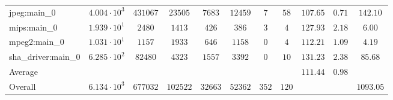 \begin{tabular}{|l|c|c|c|c|c|c|c|c|c|c|}
jpeg:main\_0            & $ 4.004 \cdot 10^{3}  $ & $ 431067 $ & $ 23505  $ & $ 7683  $ & $ 12459 $ & $ 7   $ & $ 58  $ & $ 107.65      $ & $ 0.71    $ & $ 142.10  $ \\
mips:main\_0            & $ 1.939 \cdot 10^{1}  $ & $ 2480   $ & $ 1413   $ & $ 426   $ & $ 386   $ & $ 3   $ & $ 4   $ & $ 127.93      $ & $ 2.18    $ & $ 6.00    $ \\
mpeg2:main\_0           & $ 1.031 \cdot 10^{1}  $ & $ 1157   $ & $ 1933   $ & $ 646   $ & $ 1158  $ & $ 0   $ & $ 4   $ & $ 112.21      $ & $ 1.09    $ & $ 4.19    $ \\
sha\_driver:main\_0     & $ 6.285 \cdot 10^{2}  $ & $ 82480  $ & $ 4323   $ & $ 1557  $ & $ 3392  $ & $ 0   $ & $ 10  $ & $ 131.23      $ & $ 2.38    $ & $ 85.68   $ \\
\hline
Average                 & $                     $ & $        $ & $        $ & $       $ & $       $ & $     $ & $     $ & $ 111.44      $ & $ 0.98    $ & $         $ \\
\hline
Overall                 & $ 6.134 \cdot 10^{3}  $ & $ 677032 $ & $ 102522 $ & $ 32663 $ & $ 52362 $ & $ 352 $ & $ 120 $ & $             $ & $         $ & $ 1093.05 $ \\
\hline
\end{tabular}
